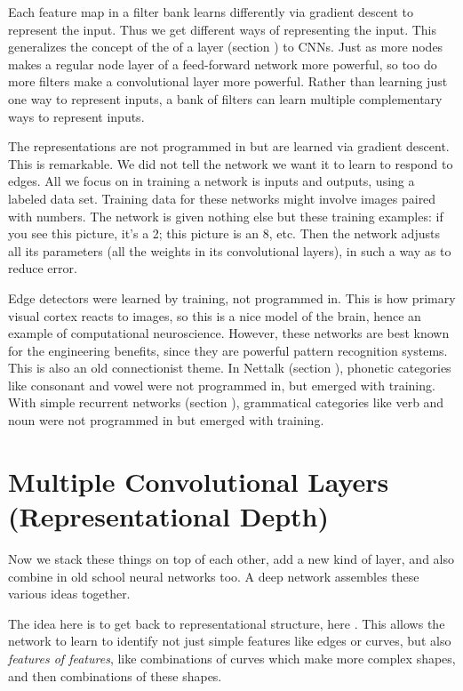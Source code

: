 Each feature map in a filter bank learns differently via gradient descent to represent the input. Thus we get different ways of representing the input. This generalizes the concept of the  of a layer (section ) to CNNs. Just as more nodes makes a regular node layer of a feed-forward network more powerful, so too do more filters make a convolutional layer more powerful. Rather than learning just one way to represent inputs, a bank of filters can learn multiple complementary ways to represent inputs.

The representations are not programmed in but are learned via gradient descent. This is remarkable. We did not tell the network we want it to learn to respond to edges. All we focus on in training a network is inputs and outputs, using a labeled data set. Training data for these networks might involve images paired with numbers. The network is given nothing else but these training examples: if you see this picture, it's a 2; this picture is an 8, etc. Then the network adjusts all its parameters (all the weights in its convolutional layers), in such a way as to reduce error. 

Edge detectors were learned by training, not programmed in. This is how primary visual cortex reacts to images, so this is a nice model of the brain, hence an example of computational  neuroscience. However, these networks are best known for the engineering benefits, since they are powerful pattern recognition systems. This is also an old connectionist theme. In Nettalk (section ), phonetic categories like consonant and vowel were not programmed in, but emerged with training. With simple recurrent networks  (section ), grammatical categories like verb and noun were not programmed in but  emerged with training.

\section{Multiple Convolutional Layers (Representational Depth)}

Now we stack these things on top of each other, add a new kind of layer, and also combine in old school neural networks too. A deep network assembles these various ideas together.

The idea here is to get back to representational structure, here . This allows the network to learn to identify not just simple features like edges or curves, but also \emph{features of features}, like combinations of curves which make more complex shapes, and then combinations of these shapes. 

